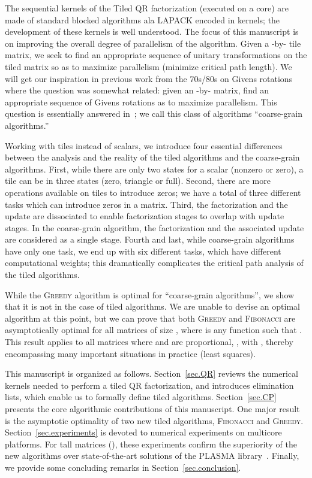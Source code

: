 \documentclass[a4paper,twopages]{article}
\newcommand{\MC}{\textsc{Fibonacci}\xspace}
\newcommand{\Greedy}{\textsc{Greedy}\xspace}
\begin{document}
The sequential kernels of the Tiled QR factorization (executed on a core) are
made of standard blocked algorithms ala LAPACK encoded in kernels; the
development of these kernels is well understood. The focus of this manuscript is on
improving the overall degree of parallelism of the algorithm.  Given a
-by- tile matrix, we seek to find an appropriate sequence of unitary
transformations on the tiled matrix so as to maximize parallelism (minimize
critical path length). We will get our inspiration in previous work from the
70s/80s on Givens rotations where the question was somewhat related: given an
-by- matrix, find an appropriate sequence of Givens rotations as to
maximize parallelism. This question is essentially answered
in~\cite{j12,j14,ModiClarke84,SamehKuck78}; we call this class of
algorithms ``coarse-grain algorithms.''

Working with tiles instead of scalars, we introduce four essential differences
between the analysis and the reality of the tiled algorithms and the
coarse-grain algorithms.  First, while there are only two states for a scalar
(nonzero or zero), a tile can be in three states (zero, triangle or full).
Second, there are more operations available on tiles to introduce zeros; we have
a total of three different tasks which can introduce zeros in a matrix.  Third,
the factorization and the update are dissociated to enable factorization stages
to overlap with update stages. In the coarse-grain algorithm, the factorization and the
associated update are considered as a single stage. Fourth and last, while
coarse-grain algorithms have only one task, we end up with six different tasks,
which have different computational weights; this dramatically complicates the critical path analysis of
the tiled algorithms.


While the \Greedy algorithm is optimal for ``coarse-grain algorithms'', we show
that it is not in the case of tiled algorithms. We are unable to devise an
optimal algorithm at this point, but we can prove that both \Greedy and \MC are
asymptotically optimal for all matrices of size , where  is
any function such that . This result applies to all
matrices where  and  are proportional, , with , thereby encompassing many important situations in practice (least
squares).

This manuscript is organized as follows. Section~\ref{sec.QR} reviews the numerical
kernels needed to perform a tiled QR factorization, and introduces elimination lists,
which enable us to formally define tiled algorithms. Section~\ref{sec.CP} presents the core
algorithmic contributions of this manuscript. One major result is the asymptotic optimality of two new tiled algorithms, \MC and \Greedy.
Section~\ref{sec.experiments} is devoted to numerical experiments on
multicore platforms. For tall matrices (), these experiments confirm the superiority
of the new algorithms over state-of-the-art solutions of the PLASMA library~\cite{Buttari2008,tileplasma,CAQR,Hadri_ipdps_2010}.
Finally, we provide some concluding remarks in Section~\ref{sec.conclusion}.
\end{document}
